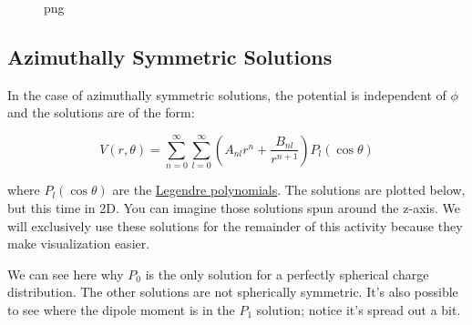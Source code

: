 \begin{figure}
\centering
{}
\caption{png}
\end{figure}

\subsection{Azimuthally Symmetric
Solutions}\label{azimuthally-symmetric-solutions}

In the case of azimuthally symmetric solutions, the potential is
independent of \(\phi\) and the solutions are of the form:

\[V(r,\theta) = \sum_{n=0}^\infty \sum_{l=0}^\infty \left(A_{nl} r^n + \frac{B_{nl}}{r^{n+1}}\right) P_l(\cos\theta)\]

where \(P_l(\cos\theta)\) are the
\href{https://en.wikipedia.org/wiki/Legendre_polynomials}{Legendre
polynomials}. The solutions are plotted below, but this time in 2D. You
can imagine those solutions spun around the z-axis. We will exclusively
use these solutions for the remainder of this activity because they make
visualization easier.

We can see here why \(P_0\) is the only solution for a perfectly
spherical charge distribution. The other solutions are not spherically
symmetric. It's also possible to see where the dipole moment is in the
\(P_1\) solution; notice it's spread out a bit.

